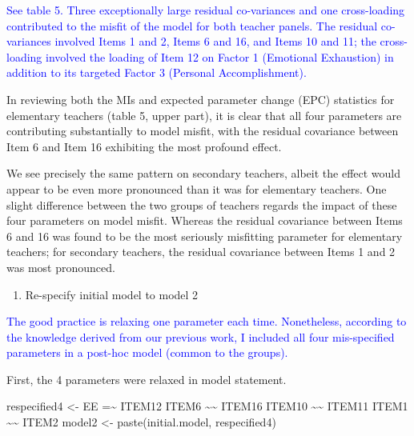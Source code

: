 \documentclass[
]{article}
\newenvironment{Shaded}{\begin{snugshade}}{\end{snugshade}}
\newcommand{\FunctionTok}[1]{\textcolor[rgb]{0.00,0.00,0.00}{#1}}
\newcommand{\NormalTok}[1]{#1}
\newcommand{\OtherTok}[1]{\textcolor[rgb]{0.56,0.35,0.01}{#1}}
\newcommand{\StringTok}[1]{\textcolor[rgb]{0.31,0.60,0.02}{#1}}
\providecommand{\tightlist}{%
  \setlength{\itemsep}{0pt}\setlength{\parskip}{0pt}}
\begin{document}
\textcolor{blue}{See table 5. Three exceptionally large residual co-variances and one cross-loading contributed to the misfit of the model for both teacher panels. The residual co-variances involved Items 1 and 2, Items 6 and 16, and Items 10 and 11; the cross-loading involved the loading of Item 12 on Factor 1 (Emotional Exhaustion) in addition to its targeted Factor 3 (Personal Accomplishment).}

In reviewing both the MIs and expected parameter change (EPC) statistics for elementary teachers (table 5, upper part), it is clear that all four parameters are contributing substantially to model misfit, with the residual covariance between Item 6 and Item 16 exhibiting the most profound effect.

We see precisely the same pattern on secondary teachers, albeit the effect would appear to be even more pronounced than it was for elementary teachers. One slight difference between the two groups of teachers regards the impact of these four parameters on model misfit. Whereas the residual covariance between Items 6 and 16 was found to be the most seriously misfitting parameter for elementary teachers; for secondary teachers, the residual covariance between Items 1 and 2 was most pronounced.

\begin{enumerate}
\def\labelenumi{(\arabic{enumi})}
\setcounter{enumi}{1}
\tightlist
\item
  Re-specify initial model to model 2
\end{enumerate}

\textcolor{blue}{The good practice is relaxing one parameter each time. Nonetheless, according to the knowledge derived from our previous work, I included all four mis-specified parameters in a post-hoc model (common to the groups).}

First, the 4 parameters were relaxed in model statement.

\begin{Shaded}
\begin{Highlighting}[]
\NormalTok{respecified4 }\OtherTok{\textless{}{-}} \StringTok{\textquotesingle{}EE =\textasciitilde{} ITEM12}
\StringTok{                 ITEM6 \textasciitilde{}\textasciitilde{} ITEM16}
\StringTok{                 ITEM10 \textasciitilde{}\textasciitilde{} ITEM11}
\StringTok{                 ITEM1 \textasciitilde{}\textasciitilde{} ITEM2}
\StringTok{                 \textquotesingle{}}
\NormalTok{model2 }\OtherTok{\textless{}{-}} \FunctionTok{paste}\NormalTok{(initial.model, respecified4)}
\end{Highlighting}
\end{Shaded}
\end{document}
